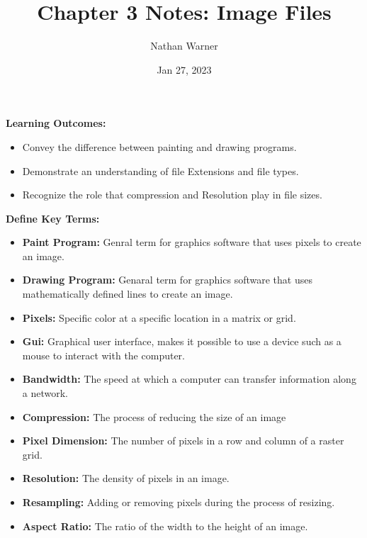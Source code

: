 \documentclass{report}
\title{\Huge{Chapter 3 Notes: Image Files}}
\author{\huge{Nathan Warner}}
\date{\huge{Jan 27, 2023}}
\begin{document}
    \maketitle

    \begin{Large}
        \noindent \textbf{Learning Outcomes:}
    \end{Large}
    \begin{itemize}
        \item Convey the difference between painting and drawing programs. 
        \item Demonstrate an understanding of file Extensions and file types.
        \item Recognize the role that compression and Resolution play in file sizes.
    \end{itemize}
   
    \bigbreak \noindent \bigbreak \noindent 
    \begin{Large}
       \noindent \textbf{Define Key Terms:} 
    \end{Large}
    \begin{itemize}
        \item \textbf{Paint Program:} Genral term for graphics software that uses pixels to create an image.
            \item \textbf{Drawing Program:} Genaral term for graphics software that uses mathematically defined lines to create an image.
            \item \textbf{Pixels:} Specific color at a specific location in a matrix or grid.
            \item \textbf{Gui:} Graphical user interface, makes it possible to use a device such as a mouse to interact with the computer.
            \item \textbf{Bandwidth:} The speed at which a computer can transfer information along a network.
            \item \textbf{Compression:} The process of reducing the size of an image
            \item \textbf{Pixel Dimension:} The number of pixels in a row and column of a raster grid.
            \item \textbf{Resolution:} The density of pixels in an image.
            \item \textbf{Resampling:} Adding or removing pixels during the process of resizing.
            \item \textbf{Aspect Ratio:} The ratio of the width to the height of an image.
    \end{itemize}
\end{document}
